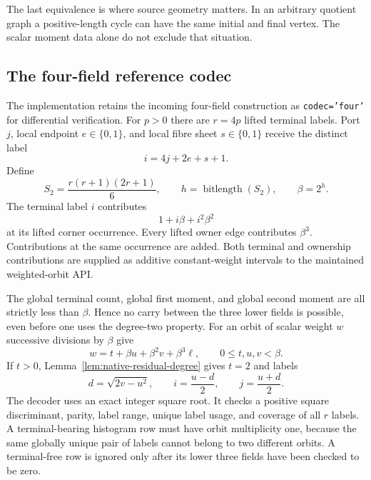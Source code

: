 The last equivalence is where source geometry matters.  In an arbitrary
quotient graph a positive-length cycle can have the same initial and final
vertex.  The scalar moment data alone do not exclude that situation.

\subsection{The four-field reference codec}

The implementation retains the incoming four-field construction as
\texttt{codec='four'} for differential verification.  For $p>0$ there
are $r=4p$ lifted terminal labels.  Port $j$, local endpoint
$e\in\{0,1\}$, and local fibre sheet $s\in\{0,1\}$ receive the distinct
label
\[
                       i=4j+2e+s+1.
\]
Define
\begin{equation}
\label{eq:native-moment-base}
 S_2=\frac{r(r+1)(2r+1)}6,
 \qquad h=\operatorname{bitlength}(S_2),
 \qquad \beta=2^h.
\end{equation}
The terminal label $i$ contributes
\begin{equation}
\label{eq:native-terminal-scalar}
                         1+i\beta+i^2\beta^2
\end{equation}
at its lifted corner occurrence.  Every lifted owner edge contributes
$\beta^3$.  Contributions at the same occurrence are added.  Both terminal
and ownership contributions are supplied as additive constant-weight
intervals to the maintained weighted-orbit API.

The global terminal count, global first moment, and global second moment
are all strictly less than $\beta$.  Hence no carry between the three
lower fields is possible, even before one uses the degree-two property.
For an orbit of scalar weight $w$ successive divisions by $\beta$ give
\[
               w=t+\beta u+\beta^2 v+\beta^3\ell,
               \qquad 0\leq t,u,v<\beta.
\]
If $t>0$, Lemma~\ref{lem:native-residual-degree} gives $t=2$ and labels
\begin{equation}
\label{eq:native-moment-decode}
 d=\sqrt{2v-u^2},\qquad
 i=\frac{u-d}{2},\qquad j=\frac{u+d}{2}.
\end{equation}
The decoder uses an exact integer square root.  It checks a positive square
discriminant, parity, label range, unique label usage, and coverage of all
$r$ labels.  A terminal-bearing histogram row must have orbit multiplicity
one, because the same globally unique pair of labels cannot belong to two
different orbits.  A terminal-free row is ignored only after its lower
three fields have been checked to be zero.

